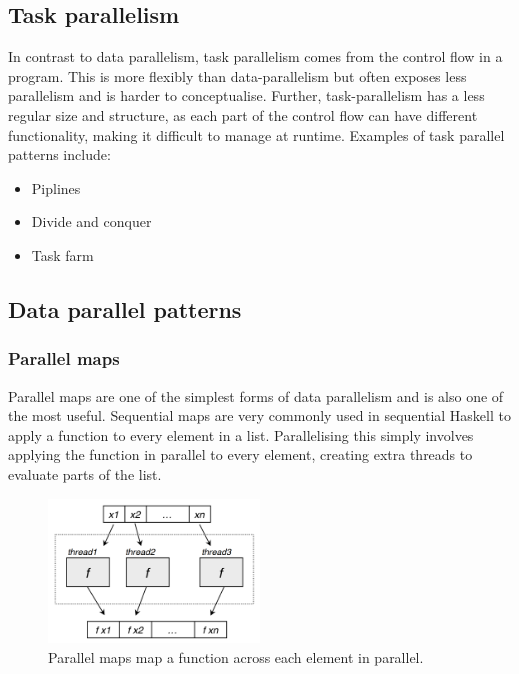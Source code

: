 \documentclass[CS4204-Notes.tex]{subfiles}
\begin{document}
\subsection{Task parallelism}
In contrast to data parallelism, task parallelism comes from the control flow in a program. This is more flexibly than data-parallelism but often exposes less parallelism and is harder to conceptualise. Further, task-parallelism has a less regular size and structure, as each part of the control flow can have different functionality, making it difficult to manage at runtime. 
\n
Examples of task parallel patterns include:
\begin{itemize}
\item Piplines
\item Divide and conquer
\item Task farm
\end{itemize}

\subsection{Data parallel patterns}
\subsubsection{Parallel maps}
Parallel maps are one of the simplest forms of data parallelism and is also one of the most useful. Sequential maps are very commonly used in sequential Haskell to apply a function to every element in a list. Parallelising this simply involves applying the function in parallel to every element, creating extra threads to evaluate parts of the list. 
\begin{figure}[H]
\centering
\includegraphics[width=0.5\textwidth, keepaspectratio]{imgs/parallel-map.png}
\caption{Parallel maps map a function across each element in parallel.}
\end{figure}
\noindent
\end{document}
